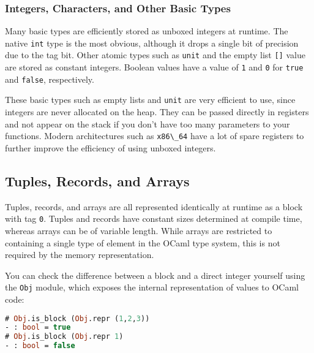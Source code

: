 \hypertarget{integers-characters-and-other-basic-types}{%
\subsubsection{Integers, Characters, and Other Basic
Types}\label{integers-characters-and-other-basic-types}}

Many basic types are efficiently stored as unboxed integers at runtime.
The native \passthrough{\lstinline!int!} type is the most obvious,
although it drops a single bit of precision due to the tag bit. Other
atomic types such as \passthrough{\lstinline!unit!} and the empty list
\passthrough{\lstinline![]!} value are stored as constant integers.
Boolean values have a value of \passthrough{\lstinline!1!} and
\passthrough{\lstinline!0!} for \passthrough{\lstinline!true!} and
\passthrough{\lstinline!false!}, respectively.

These basic types such as empty lists and \passthrough{\lstinline!unit!}
are very efficient to use, since integers are never allocated on the
heap. They can be passed directly in registers and not appear on the
stack if you don't have too many parameters to your functions. Modern
architectures such as \passthrough{\lstinline!x86\_64!} have a lot of
spare registers to further improve the efficiency of using unboxed
integers.

\hypertarget{tuples-records-and-arrays}{%
\subsection{Tuples, Records, and
Arrays}\label{tuples-records-and-arrays}}

Tuples, records, and arrays are all represented identically at runtime
as a block with tag \passthrough{\lstinline!0!}. Tuples and records have
constant sizes determined at compile time, whereas arrays can be of
variable length. While arrays are restricted to containing a single type
of element in the OCaml type system, this is not required by the memory
representation. 

You can check the difference between a block and a direct integer
yourself using the \passthrough{\lstinline!Obj!} module, which exposes
the internal representation of values to OCaml code:

\begin{lstlisting}[language=Caml]
# Obj.is_block (Obj.repr (1,2,3))
- : bool = true
# Obj.is_block (Obj.repr 1)
- : bool = false
\end{lstlisting}

